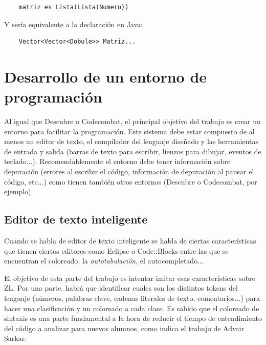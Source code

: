 \documentclass{report}
\begin{document}
\begin{BVerbatim}
	matriz es Lista(Lista(Numero))
\end{BVerbatim}

	Y sería equivalente a la declaración en Java:
	
	\begin{BVerbatim}
	Vector<Vector<Dobule>> Matriz...
	\end{BVerbatim}
	

	\section{Desarrollo de un entorno de programación}
	
	Al igual que Descubre o Codecombat, el principal objetivo del trabajo es crear un entorno para facilitar la programación. Este sistema debe estar compuesto de al menos un editor de texto, el compilador del lenguaje diseñado y las herramientas de entrada y salida (barras de texto para escribir, lienzos para dibujar, eventos de teclado...). Recomendablemente el entorno debe tener información sobre depuración (errores al escribir el código, información de depuración al pausar el código, etc...) como tienen también otros entornos (Descubre o Codecombat, por ejemplo).
	
	
	\subsection{Editor de texto inteligente}
	
	Cuando se habla de editor de texto inteligente se habla de ciertas características que tienen ciertos editores como Eclipse o Code::Blocks entre las que se encuentran el coloreado, la \textit{autotabulación}, el autocompletado... 
	
	\vspace{10px}
	
	El objetivo de esta parte del trabajo es intentar imitar esas características sobre ZL. Por una parte, habrá que identificar cuales son los distintos tokens del lenguaje (números, palabras clave, cadenas literales de texto, comentarios...) para hacer una clasificación y un coloreado a cada clase. Es sabido que el coloreado de sintaxis es una parte fundamental a la hora de reducir el tiempo de entendimiento del código a analizar para nuevos alumnos, como indica el trabajo de Advair Sarkar\cite{syntaxhighlight}.
	
\end{document}
